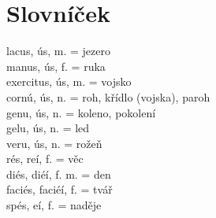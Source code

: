 \documentclass[12pt]{article}					%
\begin{document}

\newpage
\section{Slovníček}
    lacus, ús, m. = jezero\\
    manus, ús, f. = ruka\\
    exercitus, ús, m. = vojsko\\
    cornú, ús, n. = roh, křídlo (vojska), paroh\\
    genu, ús, n. = koleno, pokolení\\
    gelu, ús, n. = led\\
    veru, ús, n. = rožeň\\
    rés, reí, f. = věc\\
    diés, diéí, f. m. = den\\
    faciés, faciéí, f. = tvář\\
    spés, eí, f. = naděje\\

    

    
\end{document}
